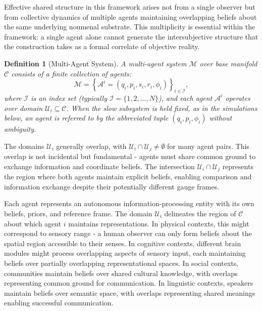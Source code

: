\documentclass[11pt]{article}
\newtheorem{definition}{Definition}
\begin{document}
Effective shared structure in this framework arises not from a single observer but from collective dynamics of multiple agents maintaining overlapping beliefs about the same underlying noumenal substrate. This multiplicity is essential within the framework: a single agent alone cannot generate the intersubjective structure that the construction takes as a formal correlate of objective reality.

\begin{definition}[Multi-Agent System]
A multi-agent system $\mathcal{M}$ over base manifold $\mathcal{C}$ consists of a finite collection of agents:
\begin{equation}
\mathcal{M} = \left\{\mathcal{A}^i = (q_i, p_i, s_i, r_i, \phi_i)\right\}_{i \in \mathcal{I}},
\end{equation}
where $\mathcal{I}$ is an index set (typically $\mathcal{I} = \{1, 2, \ldots, N\}$), and each agent $\mathcal{A}^i$ operates over domain $\mathcal{U}_i \subseteq \mathcal{C}$. When the slow subsystem is held fixed, as in the simulations below, an agent is referred to by the abbreviated tuple $(q_i, p_i, \phi_i)$ without ambiguity.
\end{definition}

The domains $\mathcal{U}_i$ generally overlap, with $\mathcal{U}_i \cap \mathcal{U}_j \neq \emptyset$ for many agent pairs. This overlap is not incidental but fundamental - agents must share common ground to exchange information and coordinate beliefs. The intersection $\mathcal{U}_i \cap \mathcal{U}_j$ represents the region where both agents maintain explicit beliefs, enabling comparison and information exchange despite their potentially different gauge frames.

Each agent represents an autonomous information-processing entity with its own beliefs, priors, and reference frame. The domain $\mathcal{U}_i$ delineates the region of $\mathcal{C}$ about which agent $i$ maintains representations. In physical contexts, this might correspond to sensory range - a human observer can only form beliefs about the spatial region accessible to their senses. In cognitive contexts, different brain modules might process overlapping aspects of sensory input, each maintaining beliefs over partially overlapping representational spaces. In social contexts, communities maintain beliefs over shared cultural knowledge, with overlaps representing common ground for communication. In linguistic contexts, speakers maintain beliefs over semantic space, with overlaps representing shared meanings enabling successful communication.
\end{document}
